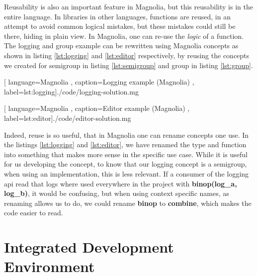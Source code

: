 Reusability is also an important feature in Magnolia, but this reusability is in
the entire language. In libraries in other languages, functions are reused, in
an attempt to avoid common logical mistakes, but these mistakes could still be
there, hiding in plain view. In Magnolia, one can re-use the \textit{logic} of a
function. The logging and group example can be rewritten using Magnolia concepts
as shown in listing \ref{lst:logging} and \ref{lst:editor} respectively, by
reusing the concepts we created for semigroup in listing \ref{lst:semigroup} and group
in listing \ref{lst:group}.

\begin{code}[H]
  
    [ language=Magnolia
    , caption={Logging example (Magnolia)}
    , label=lst:logging]{./code/logging-solution.mg}
\end{code}

\begin{code}[H]
  
    [ language=Magnolia
    , caption={Editor example (Magnolia)}
    , label=lst:editor]{./code/editor-solution.mg}
\end{code}

Indeed, reuse is so useful, that in Magnolia one can rename concepts one use.
In the listings \ref{lst:logging} and \ref{lst:editor}, we have renamed the type
and function into something that makes more sense in the specific use case.
While it is useful for us developing the concept, to know that our logging
concept is a semigroup, when using an implementation, this is less relevant.
If a consumer of the logging \gls*{api} read that logs where used everywhere in
the project with \textbf{binop(log\_a, log\_b)}, it would be confusing, but when
using context specific names, as renaming allows us to do, we could rename
\textbf{binop} to \textbf{combine}, which makes the code easier to read.


\section{Integrated Development Environment} \label{sec:ide}

